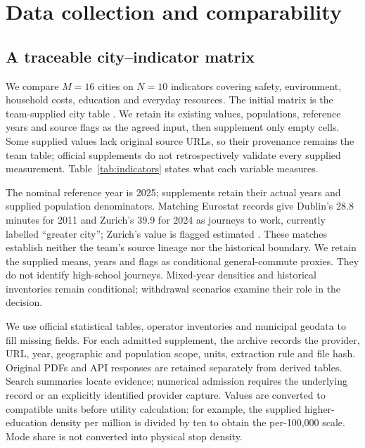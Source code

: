 \section{Data collection and comparability}
\subsection{A traceable city--indicator matrix}
We compare $M=16$ cities on $N=10$ indicators covering safety, environment,
household costs, education and everyday resources. The initial matrix is the
team-supplied city table \cite{teamtable}. We retain its existing values, populations, reference
years and source flags as the agreed input, then supplement only empty cells.
Some supplied values lack original source URLs, so their provenance remains
the team table; official supplements do not retrospectively validate every
supplied measurement. Table~\ref{tab:indicators} states what each variable measures.



The nominal reference year is 2025; supplements retain their actual years and
supplied population denominators. Matching Eurostat records give Dublin's
28.8 minutes for 2011 and Zurich's 39.9 for 2024 as journeys to work, currently
labelled ``greater city''; Zurich's value is flagged estimated \cite{eurostatcommute}.
These matches establish neither the team's source lineage nor the historical
boundary. We retain the supplied means, years and flags as conditional
general-commute proxies. They do not identify high-school journeys.
Mixed-year densities and historical inventories remain conditional;
withdrawal scenarios examine their role in the decision.

We use official statistical tables, operator inventories and municipal geodata
to fill missing fields. For each admitted supplement, the archive records the
provider, URL, year, geographic and population scope, units, extraction rule and
file hash. Original PDFs and API responses are retained separately from derived
tables. Search summaries locate evidence; numerical admission requires the
underlying record or an explicitly identified provider capture. Values are
converted to compatible units before utility calculation: for example, the
supplied higher-education density per million is divided by ten to obtain the
per-100,000 scale. Mode share is not converted into physical stop density.

